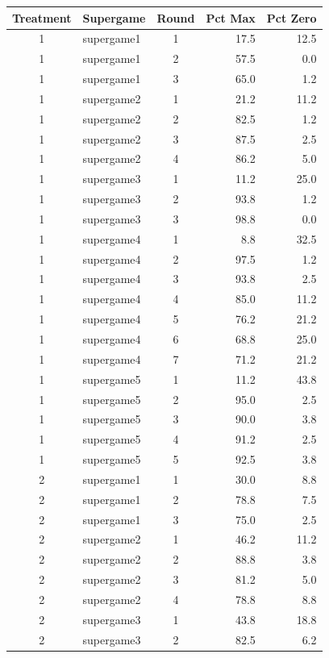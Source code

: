 \begin{tabular}{clcrr}
  \toprule
  Treatment & Supergame & Round & Pct Max & Pct Zero \\ 
  \midrule
  1 & supergame1 & 1 & 17.5 & 12.5 \\ 
  1 & supergame1 & 2 & 57.5 & 0.0 \\ 
  1 & supergame1 & 3 & 65.0 & 1.2 \\ 
  1 & supergame2 & 1 & 21.2 & 11.2 \\ 
  1 & supergame2 & 2 & 82.5 & 1.2 \\ 
  1 & supergame2 & 3 & 87.5 & 2.5 \\ 
  1 & supergame2 & 4 & 86.2 & 5.0 \\ 
  1 & supergame3 & 1 & 11.2 & 25.0 \\ 
  1 & supergame3 & 2 & 93.8 & 1.2 \\ 
  1 & supergame3 & 3 & 98.8 & 0.0 \\ 
  1 & supergame4 & 1 & 8.8 & 32.5 \\ 
  1 & supergame4 & 2 & 97.5 & 1.2 \\ 
  1 & supergame4 & 3 & 93.8 & 2.5 \\ 
  1 & supergame4 & 4 & 85.0 & 11.2 \\ 
  1 & supergame4 & 5 & 76.2 & 21.2 \\ 
  1 & supergame4 & 6 & 68.8 & 25.0 \\ 
  1 & supergame4 & 7 & 71.2 & 21.2 \\ 
  1 & supergame5 & 1 & 11.2 & 43.8 \\ 
  1 & supergame5 & 2 & 95.0 & 2.5 \\ 
  1 & supergame5 & 3 & 90.0 & 3.8 \\ 
  1 & supergame5 & 4 & 91.2 & 2.5 \\ 
  1 & supergame5 & 5 & 92.5 & 3.8 \\ 
  2 & supergame1 & 1 & 30.0 & 8.8 \\ 
  2 & supergame1 & 2 & 78.8 & 7.5 \\ 
  2 & supergame1 & 3 & 75.0 & 2.5 \\ 
  2 & supergame2 & 1 & 46.2 & 11.2 \\ 
  2 & supergame2 & 2 & 88.8 & 3.8 \\ 
  2 & supergame2 & 3 & 81.2 & 5.0 \\ 
  2 & supergame2 & 4 & 78.8 & 8.8 \\ 
  2 & supergame3 & 1 & 43.8 & 18.8 \\ 
  2 & supergame3 & 2 & 82.5 & 6.2 \\ 

\end{tabular}
